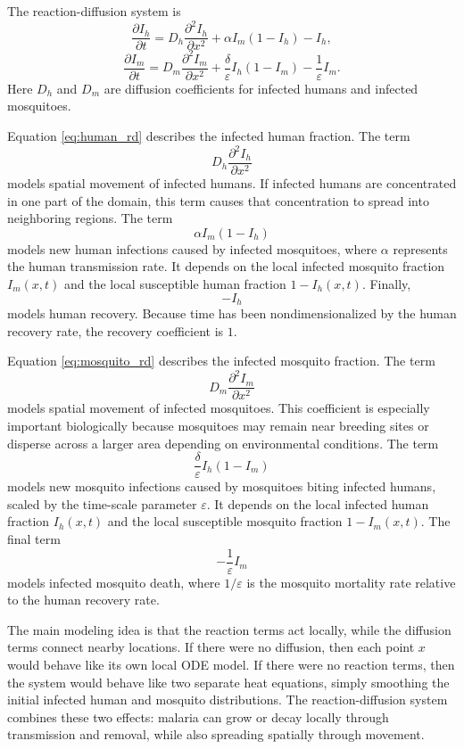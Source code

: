 \documentclass[12pt]{article}
\begin{document}
The reaction-diffusion system is
\begin{equation}
\frac{\partial I_h}{\partial t}
=
D_h\frac{\partial^2 I_h}{\partial x^2}
+
\alpha I_m(1-I_h)
-
I_h,
\label{eq:human_rd}
\end{equation}
\begin{equation}
\frac{\partial I_m}{\partial t}
=
D_m\frac{\partial^2 I_m}{\partial x^2}
+
\frac{\delta}{\varepsilon} I_h(1-I_m)
-
\frac{1}{\varepsilon} I_m.
\label{eq:mosquito_rd}
\end{equation}
Here \(D_h\) and \(D_m\) are diffusion coefficients for infected humans and infected mosquitoes. 

Equation \eqref{eq:human_rd} describes the infected human fraction. The term
\[
D_h\frac{\partial^2 I_h}{\partial x^2}
\]
models spatial movement of infected humans. If infected humans are concentrated in one part of the domain, this term causes that concentration to spread into neighboring regions. The term
\[
\alpha I_m(1-I_h)
\]
models new human infections caused by infected mosquitoes, where \(\alpha\) represents the human transmission rate. It depends on the local infected mosquito fraction \(I_m(x,t)\) and the local susceptible human fraction \(1-I_h(x,t)\). Finally,
\[
-I_h
\]
models human recovery. Because time has been nondimensionalized by the human recovery rate, the recovery coefficient is \(1\).

Equation \eqref{eq:mosquito_rd} describes the infected mosquito fraction. The term
\[
D_m\frac{\partial^2 I_m}{\partial x^2}
\]
models spatial movement of infected mosquitoes. This coefficient is especially important biologically because mosquitoes may remain near breeding sites or disperse across a larger area depending on environmental conditions. The term
\[
\frac{\delta}{\varepsilon} I_h(1-I_m)
\]
models new mosquito infections caused by mosquitoes biting infected humans, scaled by the time-scale parameter \(\varepsilon\). It depends on the local infected human fraction \(I_h(x,t)\) and the local susceptible mosquito fraction \(1-I_m(x,t)\). The final term
\[
-\frac{1}{\varepsilon} I_m
\]
models infected mosquito death, where \(1/\varepsilon\) is the mosquito mortality rate relative to the human recovery rate.

The main modeling idea is that the reaction terms act locally, while the diffusion terms connect nearby locations. If there were no diffusion, then each point \(x\) would behave like its own local ODE model. If there were no reaction terms, then the system would behave like two separate heat equations, simply smoothing the initial infected human and mosquito distributions. The reaction-diffusion system combines these two effects: malaria can grow or decay locally through transmission and removal, while also spreading spatially through movement.
\end{document}
